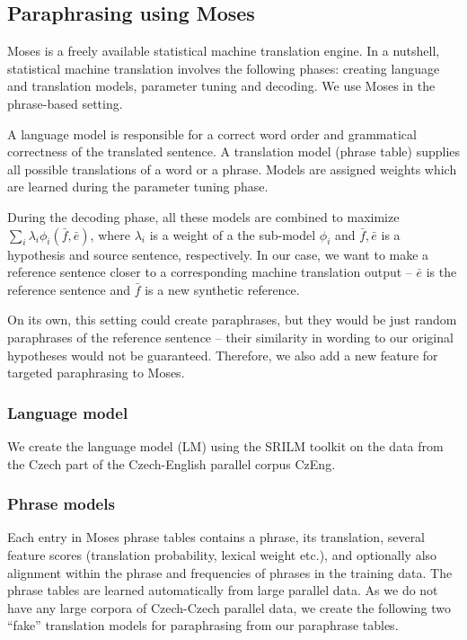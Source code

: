 \documentclass[11pt]{article}
\begin{document}
\subsection{Paraphrasing using Moses}
Moses is a freely available statistical machine translation engine. In a 
nutshell, statistical machine translation involves the following phases: 
creating language and translation models, parameter tuning and decoding. We use 
Moses in the phrase-based setting.

A language model is responsible for a correct word order and grammatical 
correctness of the translated sentence. A translation model (phrase table) 
supplies all possible translations of a word or a phrase. Models are assigned 
weights which are learned during the parameter tuning phase.

During the decoding phase, all these models are combined to maximize 
$ \sum_i \lambda_i \phi_i (\bar{f},\bar{e}) $, where  $ \lambda_i $ is a weight 
of a the sub-model $ \phi_i $ and $ \bar{f},\bar{e} $ is a hypothesis and 
source sentence, respectively. In our case, we want to make a reference 
sentence closer to a corresponding machine translation output -- $ \bar{e} $ is 
the reference sentence and $ \bar{f} $ is a new synthetic reference.

On its own, this setting could create paraphrases, but they would be just 
random paraphrases of the reference sentence -- their similarity in wording to 
our original hypotheses would not be guaranteed. Therefore, we also add a new 
feature for targeted paraphrasing to Moses.

\subsubsection{Language model}
We create the language model (LM) using the SRILM toolkit \cite{srilm} on the 
data from the Czech part of the Czech-English parallel corpus CzEng. 

\subsubsection{Phrase models}
Each entry in Moses phrase tables contains a phrase, its translation, several
feature scores (translation probability, lexical weight etc.), and optionally
also alignment within the phrase and frequencies of phrases in the training 
data. The phrase tables are learned automatically from large parallel data.
As we do not have any large corpora of Czech-Czech parallel data, we create the 
following two ``fake'' translation models for paraphrasing from our paraphrase 
tables. 
\end{document}
